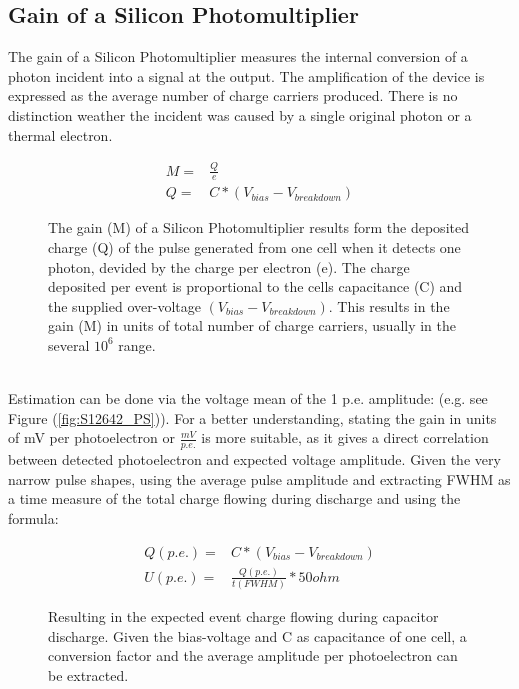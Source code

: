 \documentclass[12pt,article,type=msc,colorback,accentcolor=tud9c]{tudthesis}
\begin{document}
\subsection{Gain of a Silicon Photomultiplier}
The gain of a Silicon Photomultiplier measures the internal conversion of a photon incident into a signal at the output. The amplification of the device is expressed as the average number of charge carriers produced. There is no distinction weather the incident was caused by a single original photon or a thermal electron.
\begin{figure}[h]
\begin{equation}
\begin{split}
M = & \frac{Q}{e} \\
Q = &  C * (V_{bias}-V_{breakdown})
\end{split}
\end{equation}
\label{eq:Gain_conversion_formula}
\caption{The gain (M) of a Silicon Photomultiplier results form the deposited charge (Q) of the pulse generated from one cell when it detects one photon, devided by the charge per electron (e). The charge deposited per event is proportional to the cells capacitance (C) and the supplied over-voltage $(V_{bias}-V_{breakdown})$. This results in the gain (M) in units of total number of charge carriers, usually in the several $10^6$ range.}
\end{figure}\\
Estimation can be done via the voltage mean of the 1 p.e. amplitude: (e.g. see Figure (\ref{fig:S12642_PS})). For a better understanding, stating the gain in units of mV per photoelectron or $\frac{mV}{p.e.}$ is more suitable, as it gives a direct correlation between detected photoelectron and expected voltage amplitude. Given the very narrow pulse shapes, using the average pulse amplitude and extracting FWHM as a time measure of the total charge flowing during discharge and using the formula:
\begin{figure}[h]
\begin{equation}
\begin{split}
Q(p.e.) = & C * (V_{bias}-V_{breakdown})\\
U(p.e.) = & \frac{Q(p.e.)}{t(FWHM)} * 50ohm
\end{split}
\end{equation}
\caption{Resulting in the expected event charge flowing during capacitor discharge. Given the bias-voltage and C as capacitance of one cell, a conversion factor and the average amplitude per photoelectron can be extracted.}
\end{figure}\\
\end{document}

